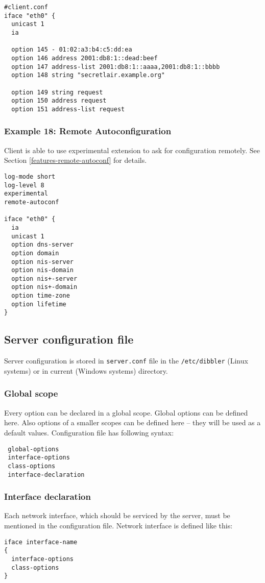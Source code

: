 \begin{lstlisting}
#client.conf
iface "eth0" {
  unicast 1
  ia

  option 145 - 01:02:a3:b4:c5:dd:ea
  option 146 address 2001:db8:1::dead:beef
  option 147 address-list 2001:db8:1::aaaa,2001:db8:1::bbbb
  option 148 string "secretlair.example.org"

  option 149 string request
  option 150 address request
  option 151 address-list request
\end{lstlisting}

\subsubsection{Example 18: Remote Autoconfiguration}
Client is able to use experimental extension to ask for configuration
remotely. See Section \ref{features-remote-autoconf} for details.

\begin{lstlisting}
log-mode short
log-level 8
experimental
remote-autoconf

iface "eth0" {
  ia
  unicast 1
  option dns-server
  option domain
  option nis-server
  option nis-domain
  option nis+-server
  option nis+-domain
  option time-zone
  option lifetime
}
\end{lstlisting}

\subsection{Server configuration file}
\label{server-conf}
Server configuration is stored in \verb+server.conf+ file in the
\verb+/etc/dibbler+ (Linux systems) or in current (Windows systems)
directory.

\subsubsection{Global scope}

Every option can be declared in a global scope. Global options can be
defined here. Also options of a smaller scopes can be defined here --
they will be used as a default values. Configuration file has following syntax:

\begin{verbatim}
 global-options
 interface-options
 class-options
 interface-declaration
\end{verbatim}

\subsubsection{Interface declaration}
Each network interface, which should be serviced by the server, must be
mentioned in the configuration file. Network interface is defined like this:
\begin{verbatim}
iface interface-name
{
  interface-options
  class-options
}
\end{verbatim}

